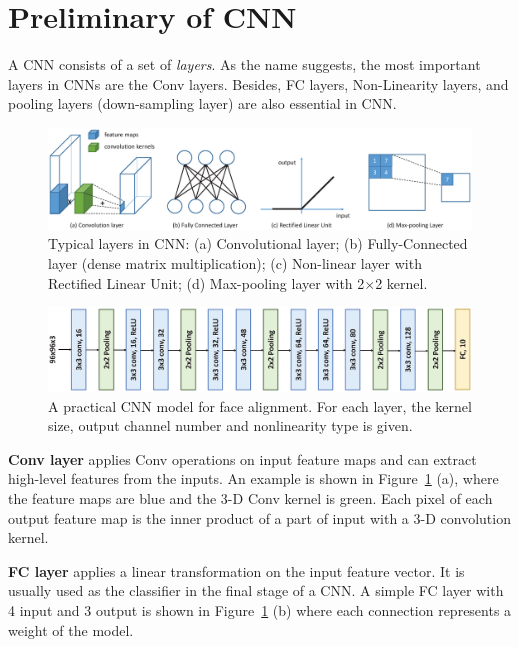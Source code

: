 \documentclass[10pt, conference, compsocconf]{IEEEtran}
\begin{document}
\section{Preliminary of CNN} \label{sec:prime}
A CNN consists of a set of \emph{layers}. As the name suggests, the most important layers in CNNs are the Conv layers. Besides, FC layers, Non-Linearity layers, and pooling layers (down-sampling layer) are also essential in CNN.

\begin{figure}[h]
  \centering
  \includegraphics[width=2\columnwidth]{figure/primer.eps}
  \small
  \caption{Typical layers in CNN: (a) Convolutional layer; (b) Fully-Connected layer (dense matrix multiplication); (c) Non-linear layer with Rectified Linear Unit; (d) Max-pooling layer with 2$\times$2 kernel.}
  \label{fig:primer}
\end{figure}

\begin{figure}[h]
  \centering
  \includegraphics[width=1.8\columnwidth]{figure/alignment_net.eps}
  \small
  \caption{A practical CNN model for face alignment. For each layer, the kernel size, output channel number and nonlinearity type is given.}
  \label{fig:face_align_net}
\end{figure}

\textbf{Conv layer} applies Conv operations on input feature maps and can extract high-level features from the inputs. An example is shown in Figure~\ref{fig:primer} (a), where the feature maps are blue and the 3-D Conv kernel is green. Each pixel of each output feature map is the inner product of a part of input with a 3-D convolution kernel.

\textbf{FC layer} applies a linear transformation on the input feature vector. It is usually used as the classifier in the final stage of a CNN. A simple FC layer with 4 input and 3 output is shown in Figure~\ref{fig:primer} (b) where each connection represents a weight of the model.
\end{document}
